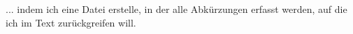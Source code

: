 
... indem ich eine Datei erstelle, in der alle Abkürzungen erfasst werden, auf die ich im Text zurückgreifen will.
